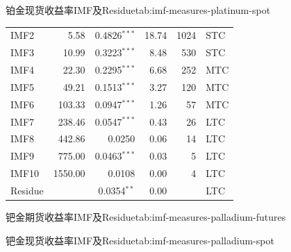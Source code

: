 \documentclass[UTF8,zihao=-4,fontset=fandol]{ctexart}
\begin{document}
\begin{center}
\begin{imfmeasurecell}{铂金现货收益率IMF及Residue}{tab:imf-measures-platinum-spot}
{\begin{tabular}{lrrrrl}
IMF2 & 5.58 & 0.4826$^{***}$ & 18.74 & 1024 & STC \\
IMF3 & 10.99 & 0.3223$^{***}$ & 8.48 & 530 & STC \\
IMF4 & 22.30 & 0.2295$^{***}$ & 6.68 & 252 & MTC \\
IMF5 & 49.21 & 0.1513$^{***}$ & 3.27 & 120 & MTC \\
IMF6 & 103.33 & 0.0947$^{***}$ & 1.26 & 57 & MTC \\
IMF7 & 238.46 & 0.0547$^{***}$ & 0.43 & 26 & LTC \\
IMF8 & 442.86 & 0.0250 & 0.06 & 14 & LTC \\
IMF9 & 775.00 & 0.0463$^{***}$ & 0.03 & 5 & LTC \\
IMF10 & 1550.00 & 0.0108 & 0.00 & 4 & LTC \\
Residue &  & 0.0354$^{**}$ & 0.00 &  & LTC \\
\bottomrule
\end{tabular}}
\end{imfmeasurecell}
\par\vspace{1em}
\begin{imfmeasurecell}{钯金期货收益率IMF及Residue}{tab:imf-measures-palladium-futures}
\end{imfmeasurecell}
\hfill
\begin{imfmeasurecell}{钯金现货收益率IMF及Residue}{tab:imf-measures-palladium-spot}

\end{imfmeasurecell}
\end{center}
\end{document}
